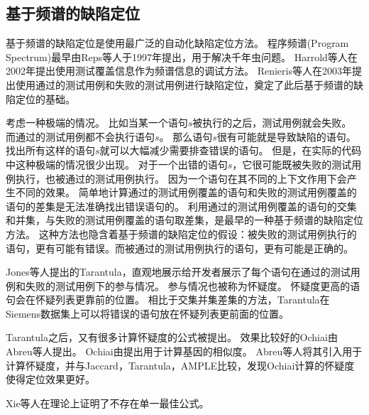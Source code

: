 \subsection{基于频谱的缺陷定位}

基于频谱的缺陷定位是使用最广泛的自动化缺陷定位方法\parencite{YingfeiFL}。
程序频谱(Program Spectrum)最早由Reps等人于1997年提出\parencite{Reps1997The}，用于解决千年虫问题。
Harrold等人在2002年\parencite{Harrold2000An}提出使用测试覆盖信息作为频谱信息的调试方法。
Renieris等人在2003年提出使用通过的测试用例和失败的测试用例进行缺陷定位\parencite{Renieres2003Fault}，奠定了此后基于频谱的缺陷定位的基础。

考虑一种极端的情况。
比如当某一个语句$s$被执行的之后，测试用例就会失败。
而通过的测试用例都不会执行语句$s$。
那么语句$s$很有可能就是导致缺陷的语句。
找出所有这样的语句$s$就可以大幅减少需要排查错误的语句。
但是，在实际的代码中这种极端的情况很少出现。
对于一个出错的语句$s$，它很可能既被失败的测试用例执行，也被通过的测试用例执行。
因为一个语句在其不同的上下文作用下会产生不同的效果。
简单地计算通过的测试用例覆盖的语句和失败的测试用例覆盖的语句的差集是无法准确找出错误语句的。
利用通过的测试用例覆盖的语句的交集和并集，与失败的测试用例覆盖的语句取差集，是最早的一种基于频谱的缺陷定位方法\parencite{Renieres2003Fault}。
这种方法也隐含着基于频谱的缺陷定位的假设：被失败的测试用例执行的语句，更有可能有错误。而被通过的测试用例执行的语句，更有可能是正确的。

Jones等人提出的Tarantula\parencite{Jones2002Visualization}，直观地展示给开发者展示了每个语句在通过的测试用例和失败的测试用例下的参与情况。
参与情况也被称为怀疑度。
怀疑度更高的语句会在怀疑列表更靠前的位置。
相比于交集并集差集的方法，Tarantula在Siemens数据集上可以将错误的语句放在怀疑列表更前面的位置\parencite{Jones2005Empirical}。

Tarantula之后，又有很多计算怀疑度的公式被提出。
效果比较好的Ochiai由Abreu等人提出\parencite{Abreu2006An}。
Ochiai由\parencite{Meyer2004Comparison}提出用于计算基因的相似度。
Abreu等人将其引入用于计算怀疑度，并与Jaccard\parencite{Chen2002Pinpoint}，Tarantula，AMPLE\parencite{Dallmeier2005Lightweight}比较，发现Ochiai计算的怀疑度使得定位效果更好\parencite{Abreu2006An,Abreu2007On}。

Xie等人在理论上证明了不存在单一最佳公式\parencite{Xie2013A}。

